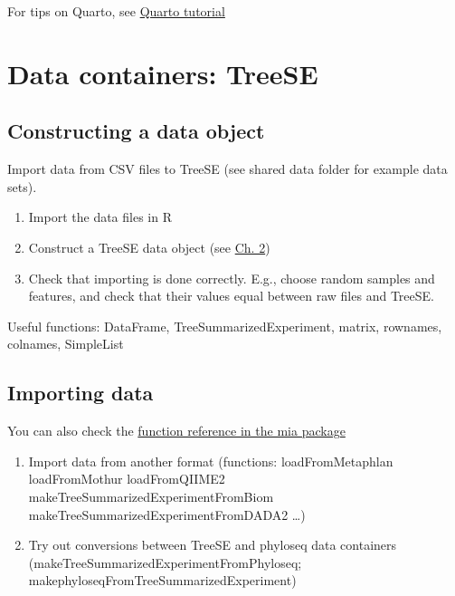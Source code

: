 \documentclass[
]{book}
\providecommand{\tightlist}{%
  \setlength{\itemsep}{0pt}\setlength{\parskip}{0pt}}
\begin{document}
For tips on Quarto, see \href{https://quarto.org/docs/authoring/markdown-basics.html}{Quarto tutorial}

\hypertarget{data-containers-treese}{%
\section{Data containers: TreeSE}\label{data-containers-treese}}

\hypertarget{constructing-a-data-object}{%
\subsection{Constructing a data object}\label{constructing-a-data-object}}

Import data from CSV files to TreeSE (see shared data folder for example data sets).

\begin{enumerate}
\def\labelenumi{\arabic{enumi}.}
\tightlist
\item
  Import the data files in R
\item
  Construct a TreeSE data object (see \href{https://microbiome.github.io/OMA/containers.html\#loading-experimental-microbiome-data}{Ch. 2})
\item
  Check that importing is done correctly. E.g., choose random samples and features,
  and check that their values equal between raw files and TreeSE.
\end{enumerate}

Useful functions: DataFrame, TreeSummarizedExperiment, matrix, rownames, colnames, SimpleList

\hypertarget{importing-data}{%
\subsection{Importing data}\label{importing-data}}

You can also check the \href{https://microbiome.github.io/mia/reference/index.html}{function reference in the mia package}

\begin{enumerate}
\def\labelenumi{\arabic{enumi}.}
\tightlist
\item
  Import data from another format (functions: loadFromMetaphlan \textbar{} loadFromMothur \textbar{} loadFromQIIME2 \textbar{} makeTreeSummarizedExperimentFromBiom \textbar{} makeTreeSummarizedExperimentFromDADA2 \ldots)
\item
  Try out conversions between TreeSE and phyloseq data containers (makeTreeSummarizedExperimentFromPhyloseq; makephyloseqFromTreeSummarizedExperiment)
\end{enumerate}
\end{document}
